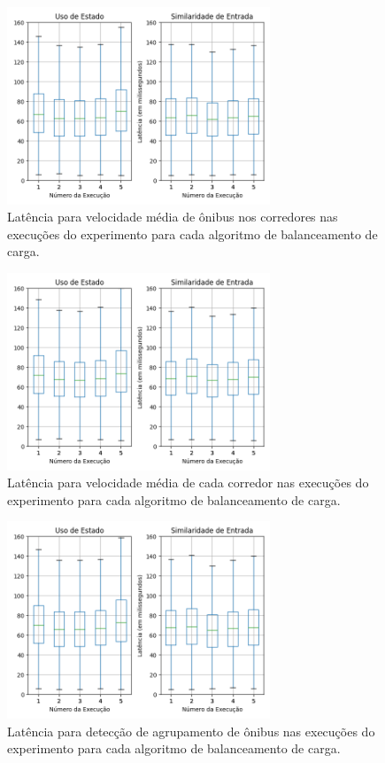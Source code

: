 \begin{figure}[ht]
  \centering
\includegraphics[width=0.7\textwidth]{figuras/graphics/boxplot_agg_vel.png}
\caption{Latência para velocidade média de ônibus nos corredores nas execuções do experimento para cada algoritmo de balanceamento de carga.}
\label{fig:boxplot_vel_agg}
\end{figure}

\begin{figure}[ht]
\centering
\includegraphics[width=0.7\textwidth]{figuras/graphics/boxplot_agg_corr.png}
 \caption{Latência para velocidade média de cada corredor nas execuções do experimento para cada algoritmo de balanceamento de carga.}
 \label{fig:boxplot_corr_agg}
\end{figure}



\begin{figure}[ht]

  \centering
\includegraphics[width=0.7\textwidth]{figuras/graphics/boxplot_agg_BusB.png}
\caption{Latência para detecção de agrupamento de ônibus nas execuções do experimento para cada algoritmo de balanceamento de carga.}
\label{fig:boxplot_BusB_agg}

\end{figure}

